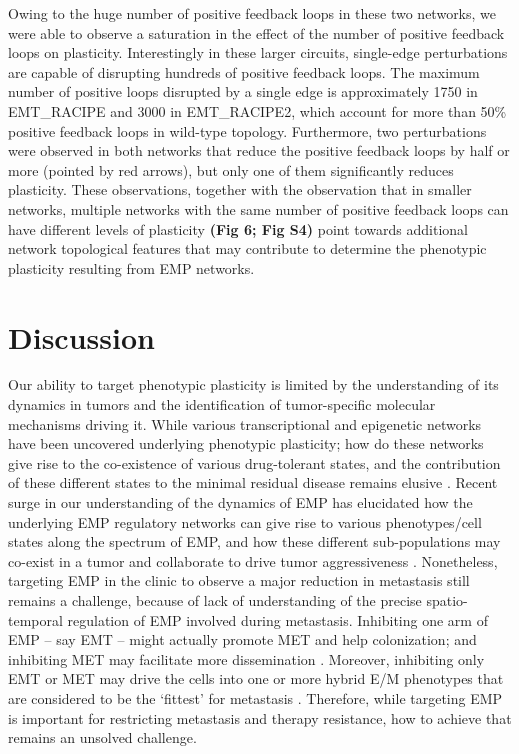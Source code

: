 \documentclass[preprint,review,12pt]{elsarticle}
\begin{document}
	Owing to the huge number of positive feedback loops in these two networks, we were able to observe a saturation in the effect of the number of positive feedback loops on plasticity. Interestingly in these larger circuits, single-edge perturbations are capable of disrupting hundreds of positive feedback loops. The maximum number of positive loops disrupted by a single edge is approximately 1750 in EMT\_RACIPE and 3000 in EMT\_RACIPE2, which account for more than 50\% positive feedback loops in wild-type topology. Furthermore, two perturbations were observed in both networks that reduce the positive feedback loops by half or more (pointed by red arrows), but only one of them significantly reduces plasticity. These observations, together with the observation that in smaller networks, multiple networks with the same number of positive feedback loops can have different levels of plasticity \textbf{(Fig 6; Fig S4)} point towards additional network topological features that may contribute to determine the phenotypic plasticity resulting from EMP networks. \color{black}
	
	\section{Discussion}
	Our ability to target phenotypic plasticity is limited by the understanding of its dynamics in tumors and the identification of tumor-specific molecular mechanisms driving it. While various transcriptional and epigenetic networks have been uncovered underlying phenotypic plasticity; how do these networks give rise to the co-existence of various drug-tolerant states, and the contribution of these different states to the minimal residual disease remains elusive \cite{Rambow2018}. Recent surge in our understanding of the dynamics of EMP has elucidated how the underlying EMP regulatory networks can give rise to various phenotypes/cell states along the spectrum of EMP, and how these different sub-populations may co-exist in a tumor and collaborate to drive tumor aggressiveness \cite{Jolly2019a}. Nonetheless, targeting EMP in the clinic to observe a major reduction in metastasis still remains a challenge, because of lack of understanding of the precise spatio-temporal regulation of EMP involved during metastasis. Inhibiting one arm of EMP $–$ say EMT $–$ might actually promote MET and help colonization; and inhibiting MET may facilitate more dissemination \cite{Bhatia2017a}. Moreover,  inhibiting only EMT or MET may drive the cells into one or more hybrid E/M phenotypes that are considered to be the ‘fittest’ for metastasis \cite{Jolly2019}. Therefore, while targeting EMP is important for restricting metastasis and therapy resistance, how to achieve that remains an unsolved challenge.
	
\end{document}
